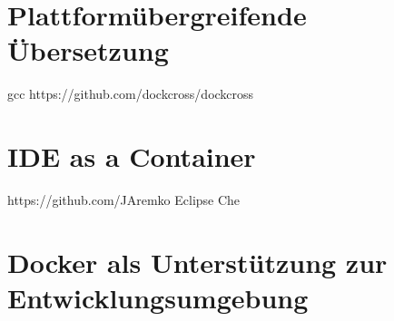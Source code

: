 \section{Plattformübergreifende Übersetzung}
\label{sec:plattformuebergreifende-uebersetzung}
gcc
https://github.com/dockcross/dockcross

\section{IDE as a Container}
\label{sec:ideasacontainer}
https://github.com/JAremko
Eclipse Che

\section{Docker als Unterstützung zur Entwicklungsumgebung}
\label{sec:docker-assistance}










